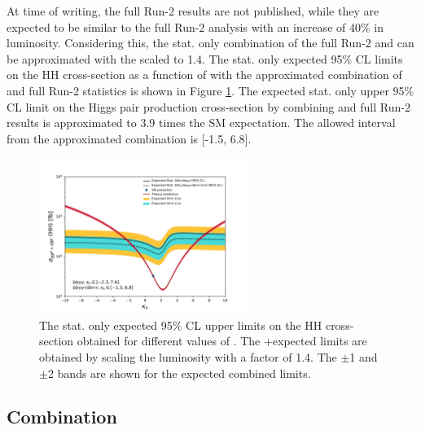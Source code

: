 At time of writing, the full Run-2 \bbtt results are not published, while they are expected to be similar to the \bbyy full Run-2 analysis with an increase of 40\% in luminosity. Considering this, the stat. only combination of the full Run-2 \bbtt and \bbyy can be approximated with the \bbyy scaled to 1.4. The stat. only expected 95\% CL limits on the HH cross-section as a function of \kl with the approximated combination of \bbyy and \bbtt full Run-2 statistics is shown in Figure \ref{fig:HHyybb:HH:tt:Comb}. The expected stat. only upper 95\% CL limit on the Higgs pair production cross-section by combining \bbyy and \bbtt full Run-2 results is approximated to 3.9 times the SM expectation. The allowed \kl interval from the approximated combination is [-1.5, 6.8].

\begin{figure}[htbp]
    \centering
    \includegraphics[width=0.6\textwidth]{Ch5/Img/kappa_lambda_x1p4_stat.pdf}
    \begin{tcolorbox}[colback=black!5!white, colframe=white!75!black]
    \caption{The stat. only expected 95\% CL upper limits on the HH cross-section obtained for different values of \kl. The \bbtt+\bbyy expected limits are obtained by scaling the \bbyy luminosity with a factor of 1.4. The $\pm$1 and $\pm$2 bands are shown for the expected combined limits.}
    \label{fig:HHyybb:HH:tt:Comb}
    \end{tcolorbox}
\end{figure}

\subsection{Combination}

